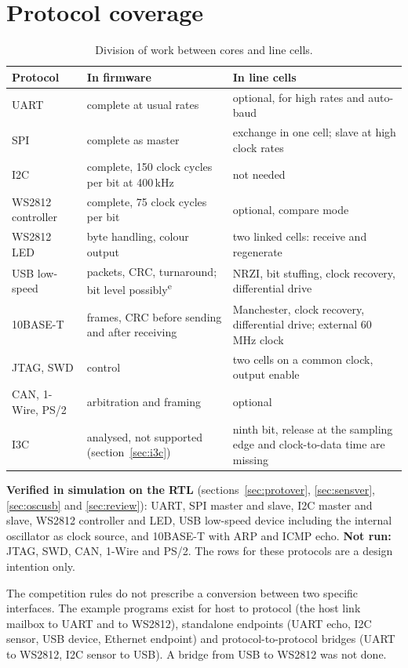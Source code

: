 \documentclass[10pt,a4paper]{article}
\newcommand{\est}{\textsuperscript{e}}
\begin{document}
\section{Protocol coverage}

\begin{table}[!htb]
\centering\small
\begin{tabularx}{\linewidth}{@{}lLL@{}}
\toprule
Protocol & In firmware & In line cells \\
\midrule
UART & complete at usual rates & optional, for high rates and auto-baud \\
SPI & complete as master & exchange in one cell; slave at high clock rates \\
I2C & complete, 150 clock cycles per bit at 400\,kHz & not needed \\
WS2812 controller & complete, 75 clock cycles per bit & optional, compare mode \\
WS2812 LED & byte handling, colour output & two linked cells: receive and regenerate \\
USB low-speed & packets, CRC, turnaround; bit level possibly\est & NRZI, bit stuffing, clock recovery, differential drive \\
10BASE-T & frames, CRC before sending and after receiving & Manchester, clock recovery, differential drive; external 60\,MHz clock \\
JTAG, SWD & control & two cells on a common clock, output enable \\
CAN, 1-Wire, PS/2 & arbitration and framing & optional \\
I3C & analysed, not supported (section~\ref{sec:i3c}) & ninth bit, release at the sampling edge and clock-to-data time are missing \\
\bottomrule
\end{tabularx}
\caption{Division of work between cores and line cells.}
\end{table}

\textbf{Verified in simulation on the RTL} (sections~\ref{sec:protover}, \ref{sec:sensver}, \ref{sec:oscusb} and \ref{sec:review}): UART,
SPI master and slave, I2C master and slave, WS2812 controller and LED, USB low-speed device including the
internal oscillator as clock source, and 10BASE-T with ARP and ICMP echo. \textbf{Not run:} JTAG, SWD, CAN,
1-Wire and PS/2. The rows for these protocols are a design intention only.

The competition rules do not prescribe a conversion between two specific interfaces. The example programs
exist for host to protocol (the host link mailbox to UART and to WS2812), standalone endpoints (UART echo, I2C
sensor, USB device, Ethernet endpoint) and protocol-to-protocol bridges (UART to WS2812, I2C sensor to USB).
A bridge from USB to WS2812 was not done.
\end{document}

